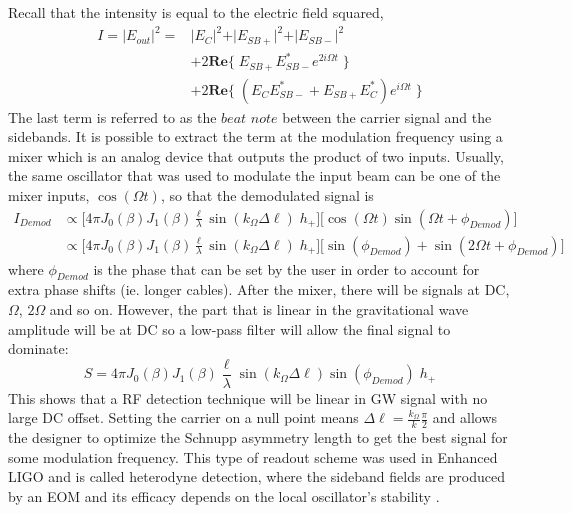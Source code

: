 		Recall that the intensity is equal to the electric field squared,
		\begin{equation}\label{RFdet}
		\begin{aligned}
			I	= \vert E_{out} \vert^2  =	&\vert E_{C}\vert^2 + \vert E_{SB+}\vert^2 + \vert E_{SB-}\vert^2 \\
										  	& + 2 \mathbf{Re} \{ \; E_{SB+} E^*_{SB-} e^{2i\Omega t} \; \}\\
										  	& + 2 \mathbf{Re} \{ \; (E_{C} E^*_{SB-} +  E_{SB+} E^*_{C} ) e^{i\Omega t} \; \}
		\end{aligned}
		\end{equation}
		The last term is referred to as the $beat$ $note$ between the carrier signal and the sidebands.  It is possible to extract the term at the modulation frequency using a mixer which is an analog device that outputs the product of two inputs. Usually, the same oscillator that was used to modulate the input beam can be one of the mixer inputs, $\cos(\Omega t)$,  so that the demodulated signal is
		\begin{equation}
		\begin{aligned}
		I_{Demod} 	&\propto \big[ 4 \pi  J_0(\beta) J_1(\beta) \frac{\ell}{\lambda}  \sin(k_{\Omega} \Delta \ell)  \; h_{+}\big] \big[ \cos(\Omega t)  \sin(\Omega t + \phi_{Demod}) \big] \\
					&\propto \big[ 4 \pi  J_0(\beta) J_1(\beta) \frac{\ell}{\lambda}  \sin(k_{\Omega} \Delta \ell)  \; h_{+}\big] \big[ \sin(\phi_{Demod}) + \sin(2\Omega t + \phi_{Demod}) \big]
		\end{aligned}
		\end{equation}
		where $\phi_{Demod}$ is the phase that can be set by the user in order to account for extra phase shifts (ie. longer cables). After the mixer, there will be signals at DC, $\Omega$, $2\Omega$ and so on. However, the part that is linear in the gravitational wave amplitude will be at DC so a low-pass filter will allow the final signal to dominate:
		\begin{equation}
		S = 4 \pi  J_0(\beta) J_1(\beta) \frac{\ell}{\lambda}  \sin(k_{\Omega} \Delta \ell) \sin(\phi_{Demod}) \; h_{+}
		\end{equation}
		This shows that a RF detection technique will be linear in GW signal with no large DC offset. Setting the carrier on a null point means $\Delta \ell = \frac{k_{\Omega}}{k} \frac{\pi}{2}$ and allows the designer to optimize the Schnupp asymmetry length to get the best signal for some modulation frequency. This type of readout scheme was used in Enhanced LIGO and is called heterodyne detection, where the sideband fields are produced by an EOM and its efficacy depends on the local oscillator's stability \cite{FritschelReadout}.  
